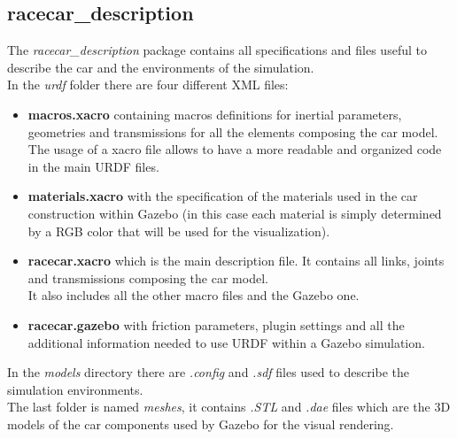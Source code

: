 \subsection{racecar\_description}
The \textit{racecar\_description} package contains all specifications and files useful
to describe the car and the environments of the simulation.\\
In the \textit{urdf} folder there are four different XML files:
\begin{itemize}
    \item \textbf{macros.xacro}
    containing macros definitions for inertial parameters, geometries and transmissions
    for all the elements composing the car model. The usage of a xacro file allows to have a more readable 
    and organized code in the main URDF files.
    \item \textbf{materials.xacro} with the specification of the materials used in the car construction within
    Gazebo (in this case each material is simply determined by a RGB color that will be used for the visualization). 
    \item \textbf{racecar.xacro} which is the main description file. It contains all links, joints and transmissions
    composing the car model.\\
    It also includes all the other macro files and the Gazebo one.
    \item \textbf{racecar.gazebo} with friction parameters, plugin settings and all the additional 
    information needed to use URDF within a Gazebo simulation.
\end{itemize}
In the \textit{models} directory there are \textit{.config} and \textit{.sdf} files used to describe
the simulation environments. \\
The last folder is named \textit{meshes}, it contains \textit{.STL} and \textit{.dae} files which are the 3D models
of the car components used by Gazebo for the visual rendering.

